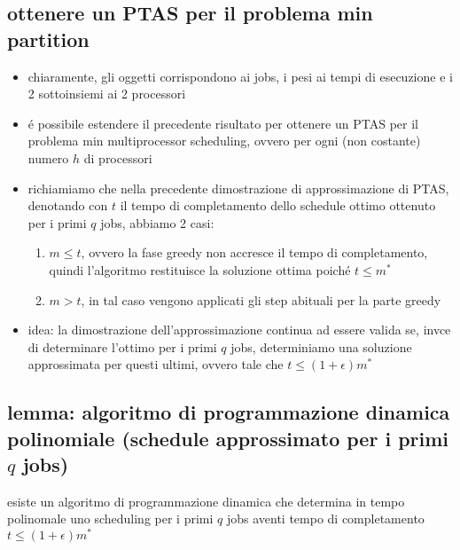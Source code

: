 
\subsection*{ottenere un PTAS per il problema min partition}
\begin{flushleft}
	\begin{itemize}
		\item chiaramente, gli oggetti corrispondono ai jobs, i pesi ai tempi di esecuzione e i 2 sottoinsiemi ai 2 processori
		\item \'e possibile estendere il precedente risultato per ottenere un PTAS per il problema min multiprocessor scheduling, ovvero per ogni (non costante) numero $h$ di processori
		\item richiamiamo che nella precedente dimostrazione di approssimazione di PTAS, denotando con $t$ il tempo di completamento dello schedule ottimo ottenuto per i primi $q$ jobs, abbiamo 2 casi:
		\begin{enumerate}
			\item $m\leq t$, ovvero la fase greedy non accresce il tempo di completamento, quindi l'algoritmo restituisce la soluzione ottima poich\'e $t\leq m^*$
			\item $m>t$, in tal caso vengono applicati gli step abituali per la parte greedy
		\end{enumerate}
		\item idea: la dimostrazione dell'approssimazione continua ad essere valida se, invce di determinare l'ottimo per i primi $q$ jobs, determiniamo una soluzione approssimata per questi ultimi, ovvero tale che $t\leq(1+\epsilon)m^*$
	\end{itemize}
\end{flushleft}


\subsection*{lemma: algoritmo di programmazione dinamica polinomiale (schedule approssimato per i primi $q$ jobs)}
\begin{flushleft}
	esiste un algoritmo di programmazione dinamica che determina in tempo polinomale uno scheduling per i primi $q$ jobs aventi tempo di completamento $t\leq(1+\epsilon)m^*$ \newline \\
\end{flushleft}

